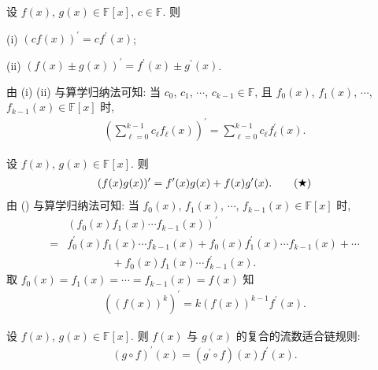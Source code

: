\begin{proposition}
    设 $f(x)$, $g(x) \in \mathbb{F}[x]$, $c \in \mathbb{F}$. 则

    (i) $(cf(x))^{\prime} = c f^{\prime} (x)$;

    (ii) $(f(x) \pm g(x))^{\prime} = f^{\prime} (x) \pm g^{\prime} (x)$.

    由 (i) (ii) 与算学归纳法可知: 当 $c_0$, $c_1$, $\cdots$, $c_{k-1} \in \mathbb{F}$, 且 $f_0 (x)$, $f_1 (x)$, $\cdots$, $f_{k-1} (x) \in \mathbb{F}[x]$ 时,
    \begin{align*}
        \left( \sum_{\ell = 0}^{k-1} c_\ell f_\ell (x) \right)^{\prime} = \sum_{\ell = 0}^{k-1} c_\ell f_\ell^{\prime} (x).
    \end{align*}
\end{proposition}

\begin{proposition}
    设 $f(x)$, $g(x) \in \mathbb{F}[x]$. 则
    \begin{align*}
        (f(x) g(x))^{\prime} = f^{\prime} (x) g(x) + f(x) g^{\prime} (x). \tag*{(\ding{72})}
    \end{align*}
    由 () 与算学归纳法可知: 当 $f_0 (x)$, $f_1 (x)$, $\cdots$, $f_{k-1} (x) \in \mathbb{F}[x]$ 时,
    \begin{align*}
             & (f_0 (x) f_1 (x) \cdots f_{k-1} (x))^{\prime}                                                      \\
        = {} & f_0^{\prime} (x) f_1 (x) \cdots f_{k-1} (x) + f_0 (x) f_1^{\prime} (x) \cdots f_{k-1} (x) + \cdots \\
             & \qquad \qquad + f_0 (x) f_1 (x) \cdots f_{k-1}^{\prime} (x).
    \end{align*}
    取 $f_0 (x) = f_1 (x) = \cdots = f_{k-1} (x) = f(x)$ 知
    \begin{align*}
        ((f(x))^k)^{\prime} = k(f(x))^{k-1} f^{\prime} (x).
    \end{align*}
\end{proposition}

\begin{proposition}
    设 $f(x)$, $g(x) \in \mathbb{F}[x]$. 则 $f(x)$ 与 $g(x)$ 的复合的流数适合链规则:
    \begin{align*}
        (g \circ f)^{\prime} (x) = (g^{\prime} \circ f)(x) f^{\prime} (x).
    \end{align*}
\end{proposition}

